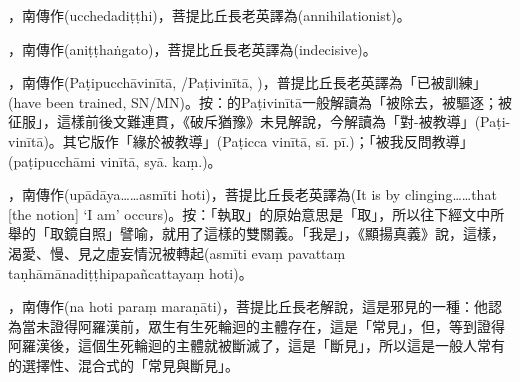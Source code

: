 \startitemgroup[noteitems]
\item{}，南傳作(ucchedadiṭṭhi)，菩提比丘長老英譯為(annihilationist)。
\stopitemgroup

\startitemgroup[noteitems]
\item{}，南傳作(aniṭṭhaṅgato)，菩提比丘長老英譯為(indecisive)。
\stopitemgroup

\startitemgroup[noteitems]
\item{}，南傳作(Paṭipucchāvinītā, /Paṭivinītā, )，普提比丘長老英譯為「已被訓練」(have been trained, SN/MN)。按：的Paṭivinītā一般解讀為「被除去，被驅逐；被征服」，這樣前後文難連貫，《破斥猶豫》未見解說，今解讀為「對-被教導」(Paṭi-vinītā)。其它版作「緣於被教導」(Paṭicca vinītā, sī. pī.)；「被我反問教導」(paṭipucchāmi vinītā, syā. kaṃ.)。 
\stopitemgroup

\startitemgroup[noteitems]
\item{}，南傳作(upādāya……asmīti hoti)，菩提比丘長老英譯為(It is by clinging……that [the notion] ‘I am’ occurs)。按：「執取」的原始意思是「取」，所以往下經文中所舉的「取鏡自照」譬喻，就用了這樣的雙關義。「我是」，《顯揚真義》說，這樣，渴愛、慢、見之虛妄情況被轉起(asmīti evaṃ pavattaṃ taṇhāmānadiṭṭhipapañcattayaṃ hoti)。
\stopitemgroup

\startitemgroup[noteitems]
\item{}，南傳作(na hoti paraṃ maraṇāti)，菩提比丘長老解說，這是邪見的一種：他認為當未證得阿羅漢前，眾生有生死輪迴的主體存在，這是「常見」，但，等到證得阿羅漢後，這個生死輪迴的主體就被斷滅了，這是「斷見」，所以這是一般人常有的選擇性、混合式的「常見與斷見」。
\stopitemgroup

